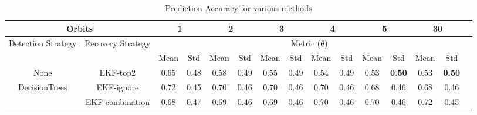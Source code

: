 \begin{table*}[] 
\label{Table: Prediction Accuracy-Reflection} 
\caption{Prediction Accuracy for various methods} 
\centering 
\begin{tabular} 
 {@{}ccccccccccccccc@{}} 
\toprule 
\multicolumn{2}{c}{\textbf{Orbits}} & 
\multicolumn{2}{c}{\textbf{1}} & 
\multicolumn{2}{c}{\textbf{2}} & 
\multicolumn{2}{c}{\textbf{3}} & 
\multicolumn{2}{c}{\textbf{4}} & 
\multicolumn{2}{c}{\textbf{5}} & 
\multicolumn{2}{c}{\textbf{30}}
 \\ \midrule 
\multicolumn{1}{|c|}{\multirow{2}{*}{Detection Strategy}} & 
\multicolumn{1}{c|}{\multirow{2}{*}{Recovery Strategy}} & 
\multicolumn{12}{c|}{Metric ($\theta$)}
 \\ \cmidrule(l){3-14} 
\multicolumn{1}{|c|}{} & 
\multicolumn{1}{c|}{} & 
\multicolumn{1}{c|}{Mean} & 
\multicolumn{1}{c|}{Std} & 
\multicolumn{1}{c|}{Mean} & 
\multicolumn{1}{c|}{Std} & 
\multicolumn{1}{c|}{Mean} & 
\multicolumn{1}{c|}{Std} & 
\multicolumn{1}{c|}{Mean} & 
\multicolumn{1}{c|}{Std} & 
\multicolumn{1}{c|}{Mean} & 
\multicolumn{1}{c|}{Std} & 
\multicolumn{1}{c|}{Mean} & 
\multicolumn{1}{c|}{Std}
 \\ \midrule 
\multicolumn{1}{|c|}{None} & 
\multicolumn{1}{c|}{EKF-top2} & 
\multicolumn{1}{c|}{0.65} & 
\multicolumn{1}{c|}{0.48} & 
\multicolumn{1}{c|}{0.58} & 
\multicolumn{1}{c|}{0.49} & 
\multicolumn{1}{c|}{0.55} & 
\multicolumn{1}{c|}{0.49} & 
\multicolumn{1}{c|}{0.54} & 
\multicolumn{1}{c|}{0.49} & 
\multicolumn{1}{c|}{0.53} & 
\multicolumn{1}{c|}{\textbf{0.50}} & 
\multicolumn{1}{c|}{0.53} & 
\multicolumn{1}{c|}{\textbf{0.50}}
 \\ \midrule 
\multicolumn{1}{|c|}{\multirow{3}{*}{DecisionTrees}} & 
\multicolumn{1}{c|}{EKF-ignore} & 
\multicolumn{1}{c|}{0.72} & 
\multicolumn{1}{c|}{0.45} & 
\multicolumn{1}{c|}{0.70} & 
\multicolumn{1}{c|}{0.46} & 
\multicolumn{1}{c|}{0.70} & 
\multicolumn{1}{c|}{0.46} & 
\multicolumn{1}{c|}{0.70} & 
\multicolumn{1}{c|}{0.46} & 
\multicolumn{1}{c|}{0.68} & 
\multicolumn{1}{c|}{0.46} & 
\multicolumn{1}{c|}{0.68} & 
\multicolumn{1}{c|}{0.46}
 \\ \cmidrule(l){2-14} 
\multicolumn{1}{|c|}{} & 
\multicolumn{1}{c|}{EKF-combination} & 
\multicolumn{1}{c|}{0.68} & 
\multicolumn{1}{c|}{0.47} & 
\multicolumn{1}{c|}{0.69} & 
\multicolumn{1}{c|}{0.46} & 
\multicolumn{1}{c|}{0.69} & 
\multicolumn{1}{c|}{0.46} & 
\multicolumn{1}{c|}{0.70} & 
\multicolumn{1}{c|}{0.46} & 
\multicolumn{1}{c|}{0.70} & 
\multicolumn{1}{c|}{0.46} & 
\multicolumn{1}{c|}{0.72} & 
\multicolumn{1}{c|}{0.45}

\end{tabular}
\end{table*}
